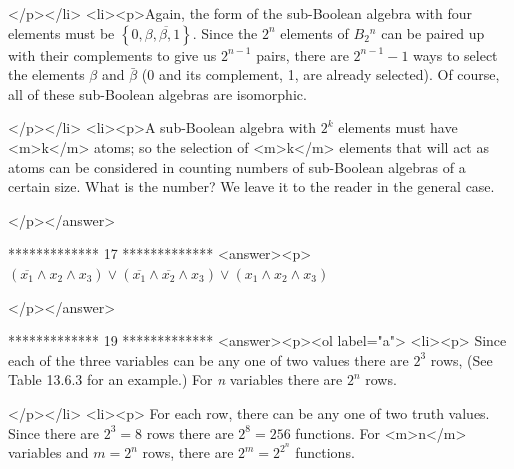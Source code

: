 </p></li>
<li><p>Again, the form of the sub-Boolean algebra with four elements must be \(\left\{0, \beta , \overline{\beta ,} 1\right\}\). Since the \(2^n\) elements
of \(B_2{}^n\) can be paired up with their complements to give us \(2^{n-1}\) pairs, there are \(2^{n-1}-1\)  ways to select the elements $\beta
$ and \(\bar{\beta }\) (0 and its complement, 1, are already selected).  Of course, all of these sub-Boolean algebras are isomorphic.

</p></li>
<li><p>A sub-Boolean algebra with \(2^k\) elements must have <m>k</m> atoms; so the selection of <m>k</m> elements that will act as atoms can be
considered in counting numbers of sub-Boolean algebras of a certain size.  What is the number?  We leave it to the reader in the general case.

</p></answer>


*************
17
*************
<answer><p>  \(\left(\overline{x_1}\land x_2\land x_3\right)\lor \left(\overline{x_1}\land \overline{x_2}\land x_3\right)\lor \left(x_1\land x_2\land x_3\right)\)

</p></answer>


*************
19
*************
<answer><p><ol label="a">
<li><p> Since each of the three variables can be any one of two values there are \(2^3\) rows, (See Table 13.6.3 for an example.) For \textit{
n} variables there are \(2^n\) rows. 

</p></li>
<li><p> For each row, there can be any one of two truth values. Since there are \(2^3=8\)  rows there are \(2^8= 256\) functions. For <m>n</m> variables
and \(m =2^n\) rows, there are \(2^m=2^{2^n}\) functions.

\begin{doublespace}
\noindent\(\)
\end{doublespace}

\begin{doublespace}
\noindent\(\)
\end{doublespace}

